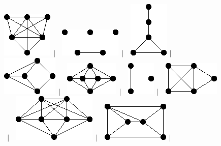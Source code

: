 \documentclass[11pt,paper=b5,footinclude,headinclude]{scrbook} %
\newtheorem{ex}{Vaja\hypertarget{sol:\theex}}[chapter]
\begin{document}
\begin{ex}
\begin{figure}
\includegraphics[scale=0.5]{smallGraphs/g_co-K3U3K1.png}$\,\mid\,$\
\includegraphics[scale=0.5]{smallGraphs/g_co-K5-e.png}$\,\mid\,$\
\includegraphics[scale=0.5]{smallGraphs/g_co-P.png}$\,\mid\,$\
\includegraphics[scale=0.5]{smallGraphs/g_co-P2UP3.png}$\,\mid\,$\
\includegraphics[scale=0.5]{smallGraphs/g_co-P2UP4.png}$\,\mid\,$\
\includegraphics[scale=0.5]{smallGraphs/g_co-P3.png}$\,\mid\,$\
\includegraphics[scale=0.5]{smallGraphs/g_co-P3U2K1.png}$\,\mid\,$\
\includegraphics[scale=0.5]{smallGraphs/g_co-P3UP4.png}$\,\mid\,$\
\includegraphics[scale=0.5]{smallGraphs/g_co-P6.png}$\,\mid\,$\

\end{figure}
\end{ex}
\end{document}
